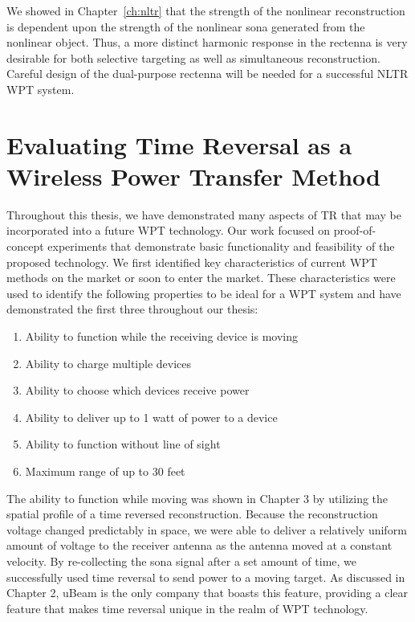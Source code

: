 We showed in Chapter~\ref{ch:nltr} that the strength of the nonlinear reconstruction is dependent upon the strength of the nonlinear sona generated from the nonlinear object. Thus, a more distinct harmonic response in the rectenna is very desirable for both selective targeting as well as simultaneous reconstruction. Careful design of the dual-purpose rectenna will be needed for a successful NLTR WPT system.

\section{Evaluating Time Reversal as a Wireless Power Transfer Method}

Throughout this thesis, we have demonstrated many aspects of TR that may be incorporated into a future WPT technology. Our work focused on proof-of-concept experiments that demonstrate basic functionality and feasibility of the proposed technology.  We first identified key characteristics of current WPT methods on the market or soon to enter the market. These characteristics were used to identify the following properties to be ideal for a WPT system and have demonstrated the first three throughout our thesis:

\begin{enumerate}
\item Ability to function while the receiving device is moving
\item Ability to charge multiple devices
\item Ability to choose which devices receive power
\item Ability to deliver up to 1 watt of power to a device
\item Ability to function without line of sight
\item Maximum range of up to 30 feet
\end{enumerate}

The ability to function while moving was shown in Chapter 3 by utilizing the spatial profile of a time reversed reconstruction. Because the reconstruction voltage changed predictably in space, we were able to deliver a relatively uniform amount of voltage to the receiver antenna as the antenna moved at a constant velocity. By re-collecting the sona signal after a set amount of time, we successfully used time reversal to send power to a moving target.  As discussed in Chapter 2, uBeam is the only company that boasts this feature, providing a clear feature that makes time reversal unique in the realm of WPT technology.

